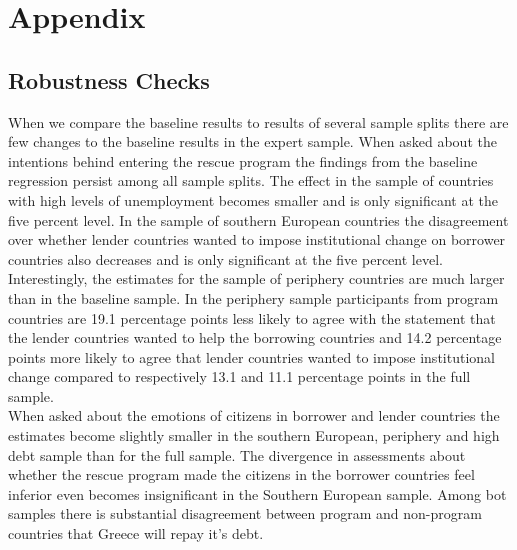 \section{Appendix}
\subsection{Robustness Checks}
When we compare the baseline results to results of several sample splits there are few changes to the baseline results in the expert sample. When asked about the intentions behind entering the rescue program the findings from the baseline regression persist among all sample splits. The effect in the sample of countries with high levels of unemployment becomes smaller and is only significant at the five percent level. In the sample of southern European countries the disagreement over whether lender countries wanted to impose institutional change on borrower countries also decreases and is only significant at the five percent level. Interestingly, the estimates for the sample of periphery countries are much larger than in the baseline sample. In the periphery sample participants from program countries are 19.1 percentage points less likely to agree with the statement that the lender countries wanted to help the borrowing countries and 14.2 percentage points more likely to agree that lender countries wanted to impose institutional change compared to respectively 13.1 and 11.1 percentage points in the full sample.\\
When asked about the emotions of citizens in borrower and lender countries the estimates become slightly smaller in the southern European, periphery and high debt sample than for the full sample. The divergence in assessments about whether the rescue program made the citizens in the borrower countries feel inferior even becomes insignificant in the Southern European sample. Among bot samples there is substantial disagreement between program and non-program countries that Greece will repay it's debt. 
\\
